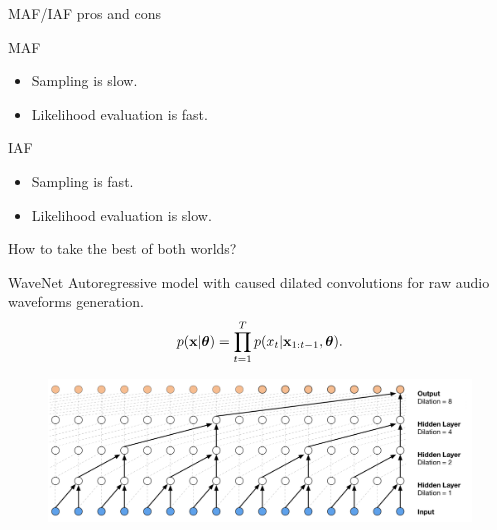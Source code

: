 \begin{frame}{MAF/IAF pros and cons}
	\begin{minipage}{0.50\columnwidth}
		\begin{block}{MAF}
			\begin{itemize}
				\item Sampling is slow.
				\item Likelihood evaluation is fast.
			\end{itemize}
		\end{block}
	\end{minipage}%
	\begin{minipage}{0.51\columnwidth}
		\begin{block}{IAF}
			\begin{itemize}
				\item Sampling is fast.
				\item Likelihood evaluation is slow.
			\end{itemize}
		\end{block}
	\end{minipage}
	How to take the best of both worlds?
	\begin{block}{WaveNet}
		Autoregressive model with caused dilated convolutions for raw audio waveforms generation.
		\vspace{-0.5cm}
		\[
			p(\mathbf{x}| \boldsymbol{\theta}) = \prod_{t=1}^T p(x_t|\mathbf{x}_{1:t-1}, \boldsymbol{\theta}).
		\]
		\vspace{-0.7cm}
		\begin{figure}
			\centering
			\includegraphics[width=0.85\linewidth]{figs/wavenet2.png}
		\end{figure}
	\end{block}
\end{frame}
